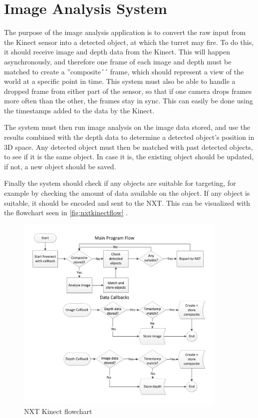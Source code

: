 \section{Image Analysis System}

\label{image_analysis_design}

The purpose of the image analysis application is to convert the raw input from the Kinect sensor into a detected
object, at which the turret may fire. To do this, it should receive image and depth data from the Kinect.
This will happen asynchronously, and therefore one frame of each image and depth must be matched to create a
''composite´´ frame, which should represent a view of the world at a specific point in time. This system must
also be able to handle a dropped frame from either part of the sensor, so that if one camera drops frames more
often than the other, the frames stay in sync. This can easily be done using the timestamps added to the data
by the Kinect.

The system must then run image analysis on the image data stored, and use the results combined with the depth
data to determine a detected object's position in 3D space. Any detected object must then be matched with past
detected objects, to see if it is the same object. In case it is, the existing object should be updated,
if not, a new object should be saved.

Finally the system should check if any objects are suitable for targeting, for example by checking the amount of
data available on the object. If any object is suitable, it should be encoded and sent to the NXT.
This can be visualized with the flowchart seen in \autoref{fig:nxtkinectflow} .

\begin{figure}[hbtp]
\includegraphics[width=0.90\textwidth]{img/nxtkinectflow3.pdf}
\caption{NXT Kinect flowchart} 
\label{fig:nxtkinectflow} 
\end{figure}

